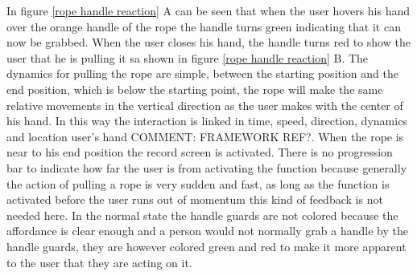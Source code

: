 In figure \ref{rope handle reaction} A can be seen that when the user hovers his hand over the orange handle of the rope the handle turns green indicating that it can now be grabbed. When the user closes his hand, the handle turns red to show the user that he is pulling it sa shown in figure \ref{rope handle reaction} B. The dynamics for pulling the rope are simple, between the starting position and the end position, which is below the starting point, the rope will make the same relative movements in the vertical direction as the user makes with the center of his hand. In this way the interaction is linked in time, speed, direction, dynamics and location user's hand {\large COMMENT: FRAMEWORK REF?}. When the rope is near to his end position the record screen is activated. There is no progression bar to indicate how far the user is from activating the function because generally the action of pulling a rope is very sudden and fast, as long as the function is activated before the user runs out of momentum this kind of feedback is not needed here. In the normal state the handle guards are not colored because the affordance is clear enough and a person would not normally grab a handle by the handle guards, they are however colored green and red to make it more apparent to the user that they are acting on it. 

